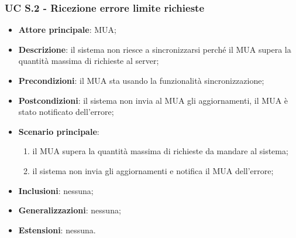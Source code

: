     \subsubsection{UC S.2 - Ricezione errore limite richieste} \label{sec:UCS.2}
    \begin{itemize}
        \item \textbf{Attore principale}: MUA;
        \item \textbf{Descrizione}: il sistema non riesce a sincronizzarsi perché il MUA supera la quantità massima di richieste al server;
        \item \textbf{Precondizioni}: il MUA sta usando la funzionalità sincronizzazione;
        \item \textbf{Postcondizioni}: il sistema non invia al MUA gli aggiornamenti, il MUA è stato notificato dell'errore;
        \item \textbf{Scenario principale}:
            \begin{enumerate}
                \item il MUA supera la quantità massima di richieste da mandare al sistema;
                \item il sistema non invia gli aggiornamenti e notifica il MUA dell'errore;
            \end{enumerate}
        \item \textbf{Inclusioni}: nessuna;
        \item \textbf{Generalizzazioni}: nessuna;
        \item \textbf{Estensioni}: nessuna.
    \end{itemize}

